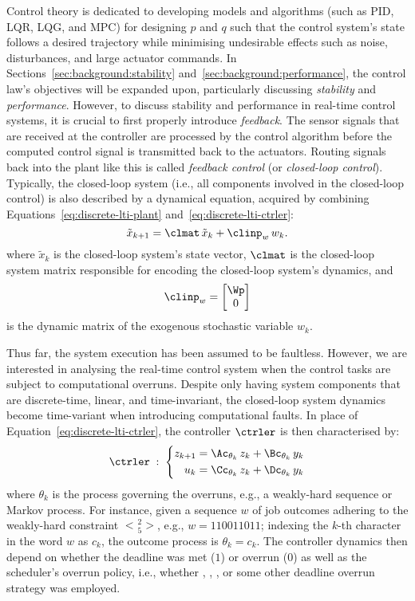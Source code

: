 Control theory is dedicated to developing models and algorithms (such as PID, LQR, LQG, and MPC) for designing $p$ and $q$ such that the control system's state follows a desired trajectory while minimising undesirable effects such as noise, disturbances, and large actuator commands.
In Sections~\ref{sec:background:stability} and~\ref{sec:background:performance}, the control law's objectives will be expanded upon, particularly discussing \emph{stability}  and \emph{performance}.
However, to discuss stability and performance in real-time control systems, it is crucial to first properly introduce \emph{feedback}.
The sensor signals that are received at the controller are processed by the control algorithm before the computed control signal is transmitted back to the actuators.
Routing signals back into the plant like this is called \emph{feedback control} (or \emph{closed-loop control}).
Typically, the closed-loop system (i.e., all components involved in the closed-loop control) is also described by a dynamical equation, acquired by combining Equations~\eqref{eq:discrete-lti-plant} and~\eqref{eq:discrete-lti-ctrler}:
%
\begin{equation}%
    \label{eq:clsys}%
    \tilde{x}_{k+1} = \clmat\, \tilde{x}_k + \clinp_w\, w_k.
\end{equation}
%
where $\tilde{x}_k$ is the closed-loop system's state vector, $\clmat$ is the closed-loop system matrix responsible for encoding the closed-loop system's dynamics, and
$$\clinp_w = \begin{bmatrix}
    \Wp \\
    0
\end{bmatrix}$$
is the dynamic matrix of the exogenous stochastic variable $w_k$.

Thus far, the system execution has been assumed to be faultless.
However, we are interested in analysing the real-time control system when the control tasks are subject to computational overruns.
Despite only having system components that are discrete-time, linear, and time-invariant, the closed-loop system dynamics become time-variant when introducing computational faults.
In place of Equation~\eqref{eq:discrete-lti-ctrler}, the controller $\ctrler$ is then characterised by:
%
\begin{equation}%
    \label{eq:tv-ctrler}%
    \ctrler \; : \; \left\{\begin{aligned}
        z_{k+1} &= \Ac_{\theta_k}\,z_k + \Bc_{\theta_k}\,y_k \\
        u_k &= \Cc_{\theta_k}\,z_k + \Dc_{\theta_k}\,y_k \\
    \end{aligned}\right.
\end{equation}
%
where $\theta_k$ is the process governing the overruns, e.g., a weakly-hard sequence or Markov process.
For instance, given a sequence $w$ of job outcomes adhering to the weakly-hard \tRH{} constraint $\genfrac{<}{>}{0pt}{}{2}{5}$, e.g., $w = 110011011$; indexing the $k$-th character in the word $w$ as $c_k$, the outcome process is $\theta_k = c_k$.
The controller dynamics then depend on whether the deadline was met ($1$) or overrun ($0$) as well as the scheduler's overrun policy, i.e., whether \tK{}, \tS{}, \tQ{}, or some other deadline overrun strategy was employed.

